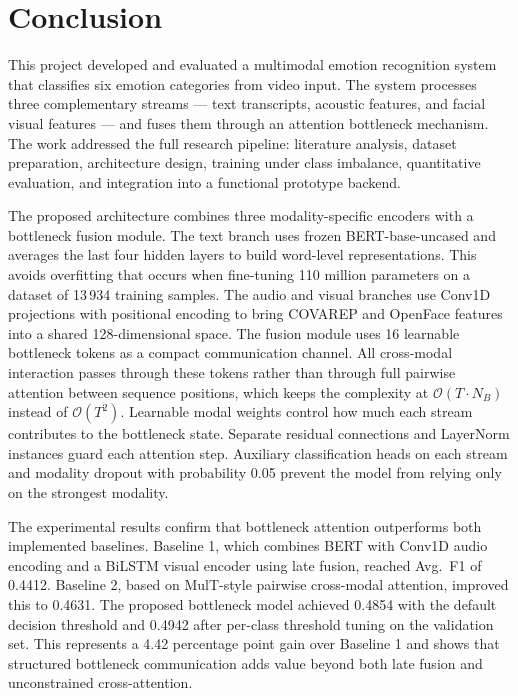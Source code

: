 \chapter{Conclusion}
\label{chap:conclusion}

This project developed and evaluated a multimodal emotion recognition system that classifies six emotion categories from video input. The system processes three complementary streams — text transcripts, acoustic features, and facial visual features — and fuses them through an attention bottleneck mechanism. The work addressed the full research pipeline: literature analysis, dataset preparation, architecture design, training under class imbalance, quantitative evaluation, and integration into a functional prototype backend.

The proposed architecture combines three modality-specific encoders with a bottleneck fusion module. The text branch uses frozen BERT-base-uncased and averages the last four hidden layers to build word-level representations. This avoids overfitting that occurs when fine-tuning 110 million parameters on a dataset of 13\,934 training samples. The audio and visual branches use Conv1D projections with positional encoding to bring COVAREP and OpenFace features into a shared 128-dimensional space. The fusion module uses 16 learnable bottleneck tokens as a compact communication channel. All cross-modal interaction passes through these tokens rather than through full pairwise attention between sequence positions, which keeps the complexity at $\mathcal{O}(T \cdot N_B)$ instead of $\mathcal{O}(T^2)$. Learnable modal weights control how much each stream contributes to the bottleneck state. Separate residual connections and LayerNorm instances guard each attention step. Auxiliary classification heads on each stream and modality dropout with probability 0.05 prevent the model from relying only on the strongest modality.

The experimental results confirm that bottleneck attention outperforms both implemented baselines. Baseline 1, which combines BERT with Conv1D audio encoding and a BiLSTM visual encoder using late fusion, reached Avg.~F1 of 0.4412. Baseline 2, based on MulT-style pairwise cross-modal attention, improved this to 0.4631. The proposed bottleneck model achieved 0.4854 with the default decision threshold and 0.4942 after per-class threshold tuning on the validation set. This represents a 4.42 percentage point gain over Baseline 1 and shows that structured bottleneck communication adds value beyond both late fusion and unconstrained cross-attention.

